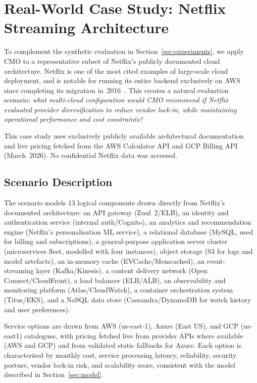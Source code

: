 \documentclass[journal]{IEEEtran}
\newcommand{\cmo}{CMO\xspace}
\begin{document}
\section{Real-World Case Study: Netflix Streaming Architecture}
\label{sec:netflix}

To complement the synthetic evaluation in Section~\ref{sec:experiments}, we
apply \cmo to a representative subset of Netflix's publicly documented cloud
architecture. Netflix is one of the most cited examples of large-scale cloud
deployment, and is notable for running its entire backend exclusively on AWS
since completing its migration in~2016~\cite{aws_netflix}. This creates a
natural evaluation scenario: \textit{what multi-cloud configuration would \cmo
recommend if Netflix evaluated provider diversification to reduce vendor
lock-in, while maintaining operational performance and cost constraints?}

This case study uses exclusively publicly available architectural documentation
\cite{aws_netflix,netflix_techblog,netflix_zuul,netflix_atlas,netflix_titus,netflix_openconnect}
and live pricing fetched from the AWS Calculator API and GCP Billing API
(March~2026). No confidential Netflix data was accessed.

\subsection{Scenario Description}
\label{sec:netflix_scenario}

The scenario models 13 logical components drawn directly from Netflix's
documented architecture: an API gateway (Zuul~2/ELB), an identity and
authentication service (internal auth/Cognito), an analytics and recommendation
engine (Netflix's personalisation ML service), a relational database (MySQL,
used for billing and subscriptions), a general-purpose application server
cluster (microservices fleet, modelled with four instances), object storage
(S3 for logs and model artefacts), an in-memory cache (EVCache/Memcached), an
event-streaming layer (Kafka/Kinesis), a content delivery network (Open
Connect/CloudFront), a load balancer (ELB/ALB), an observability and monitoring
platform (Atlas/CloudWatch), a container orchestration system (Titus/EKS), and
a NoSQL data store (Cassandra/DynamoDB for watch history and user preferences).

Service options are drawn from AWS (us-east-1), Azure (East US), and GCP
(us-east1) catalogues, with pricing fetched live from provider APIs where
available (AWS and GCP) and from validated static fallbacks for Azure. Each
option is characterised by monthly cost, service processing latency,
reliability, security posture, vendor lock-in risk, and scalability score,
consistent with the model described in Section~\ref{sec:model}.
\end{document}

